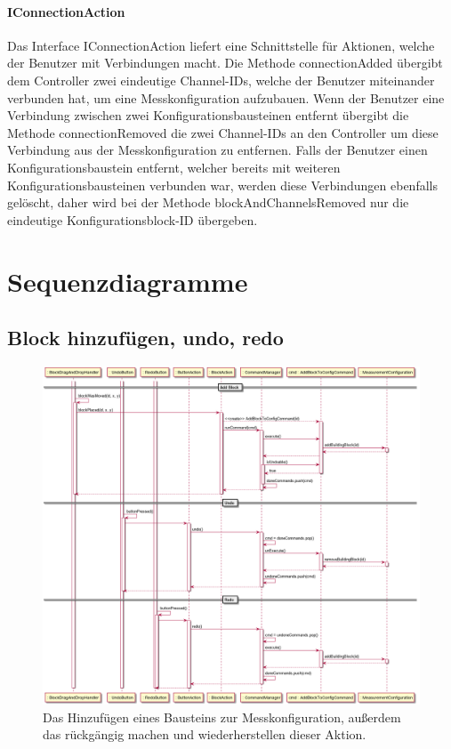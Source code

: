 \documentclass[parskip=full]{scrartcl}
\begin{document}
\paragraph{IConnectionAction}

Das Interface IConnectionAction liefert eine Schnittstelle für Aktionen, welche der Benutzer mit Verbindungen macht. 
Die Methode connectionAdded übergibt dem Controller zwei eindeutige Channel-IDs, welche der Benutzer miteinander verbunden hat, um eine Messkonfiguration aufzubauen.
Wenn der Benutzer eine Verbindung zwischen zwei Konfigurationsbausteinen entfernt übergibt die Methode connectionRemoved die zwei Channel-IDs an den Controller um diese Verbindung aus der Messkonfiguration zu entfernen.
Falls der Benutzer einen Konfigurationsbaustein entfernt, welcher bereits mit weiteren Konfigurationsbausteinen verbunden war, werden diese Verbindungen ebenfalls gelöscht, daher wird bei der Methode blockAndChannelsRemoved nur die eindeutige Konfigurationsblock-ID übergeben.

\clearpage
\section{Sequenzdiagramme}

\subsection{Block hinzufügen, undo, redo}

\begin{figure}[htbp]
	\begin{center}
		\includegraphics[width = 15cm]{Grafiken/AddBlockSequence.png}
		\caption{Das Hinzufügen eines Bausteins zur Messkonfiguration, außerdem das rückgängig machen und wiederherstellen dieser Aktion.}
		\label{AddBlockSequence}
	\end{center}
\end{figure}
\end{document}
